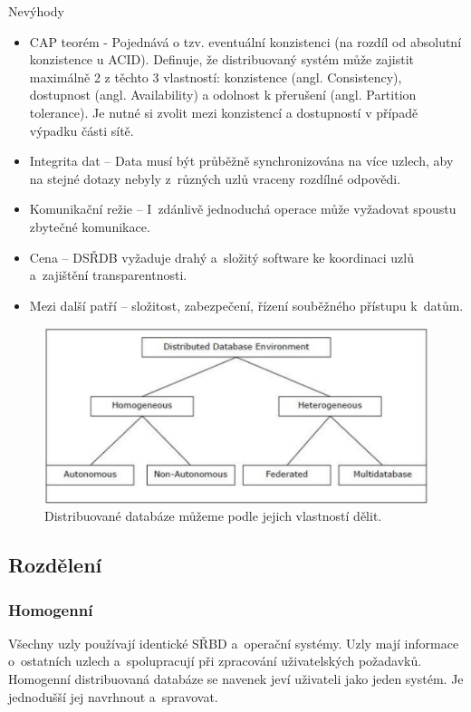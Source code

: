 \noindent Nevýhody
\begin{itemize}
\item CAP teorém - Pojednává o tzv. eventuální konzistenci (na rozdíl od absolutní konzistence u ACID). Definuje, že distribuovaný systém může zajistit maximálně 2 z těchto 3 vlastností: konzistence (angl. Consistency), dostupnost (angl. Availability) a odolnost k přerušení (angl. Partition tolerance). Je nutné si zvolit mezi konzistencí a dostupností v případě výpadku části sítě.

\item Integrita dat – Data musí být průběžně synchronizována na více uzlech, aby na stejné dotazy nebyly z~různých uzlů vraceny rozdílné odpovědi.

\item Komunikační režie – I~zdánlivě jednoduchá operace může vyžadovat spoustu zbytečné komunikace.

\item Cena – DSŘDB vyžaduje drahý a~složitý software ke koordinaci uzlů a~zajištění transparentnosti. \cite{distributedDBMS}

\item Mezi další patří – složitost, zabezpečení, řízení souběžného přístupu k~datům.
\end{itemize}

\begin{figure}[!h]
  \centering
  \includegraphics[width=14cm]{template-fig/distributed_database_environments.pdf}
  \caption{Distribuované databáze můžeme podle jejich vlastností dělit. \cite{distributedDBMS}}
  \label{FIG_DivDistrDB}
\end{figure}

\subsection{Rozdělení}
\subsubsection{Homogenní}
Všechny uzly používají identické SŘBD a~operační systémy. Uzly mají informace o~ostatních uzlech a~spolupracují při zpracování uživatelských požadavků. Homogenní distribuovaná databáze se navenek jeví uživateli jako jeden systém. Je jednodušší jej navrhnout a~spravovat.

